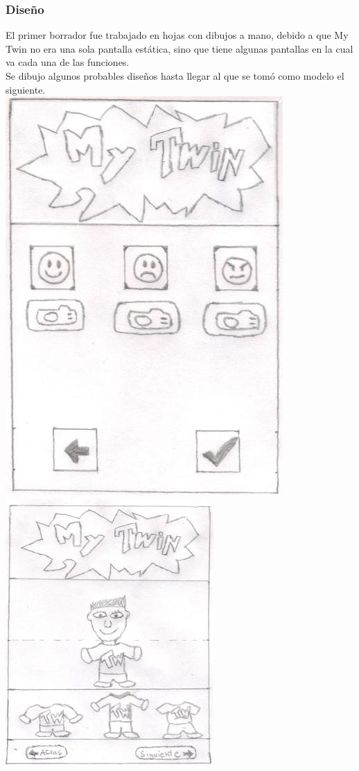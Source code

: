 \documentclass[10pt]{article}
\begin{document}
{%
\newpage
\begin{flushleft}
\subsubsection{Dise\~no}
El primer borrador fue trabajado en hojas con dibujos a mano, debido a que My Twin no era una sola pantalla est\'atica, sino que tiene algunas pantallas en la cual va cada una de las funciones.\\
Se dibujo algunos probables dise\~nos hasta llegar al que se tom\'o como modelo el siguiente.\\
\vspace{0.3in}
\includegraphics[scale=0.5]{Twin1}
\hspace{0.2in}\includegraphics[scale=0.75]{Twin2}\vspace{0.2in}

\end{flushleft}}
\end{document}
